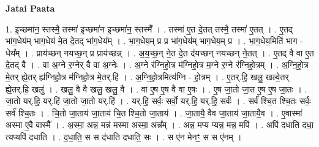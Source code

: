 \documentclass[17pt]{extarticle}
\begin{document}
\textbf{Jatai Paata} \newline

1. इ॒च्छमा॑न॒ स्तस्मै॒ तस्मा॑ इ॒च्छमा॑न इ॒च्छमा॑न॒ स्तस्मै᳚ । . तस्मा॑ ए॒त दे॒तत् तस्मै॒ तस्मा॑ ए॒तत् । . ए॒तद् भा॑ग॒धेय॑म् भाग॒धेय॑ मे॒त दे॒तद् भा॑ग॒धेय᳚म् । . भा॒ग॒धेय॒म् प्र प्र भा॑ग॒धेय॑म् भाग॒धेय॒म् प्र । . भा॒ग॒धेय॒मिति॑ भाग - धेय᳚म् । . प्राय॑च्छन् नयच्छ॒न् प्र प्राय॑च्छन्न् । . अ॒य॒च्छ॒न् ने॒त दे॒त द॑यच्छन् नयच्छन् ने॒तत् । . ए॒तद् वै वा ए॒त दे॒तद् वै । . वा अ॒ग्ने र॒ग्नेर् वै वा अ॒ग्नेः । . अ॒ग्ने र॑ग्निहो॒त्र म॑ग्निहो॒त्र म॒ग्ने र॒ग्ने र॑ग्निहो॒त्रम् । . अ॒ग्नि॒हो॒त्र मे॒तर् ह्ये॒तर् ह्य॑ग्निहो॒त्र म॑ग्निहो॒त्र मे॒तर्.हि॑ । . अ॒ग्नि॒हो॒त्रमित्य॑ग्नि - हो॒त्रम् । . ए॒तर्.हि॒ खलु॒ खल्वे॒तर् ह्ये॒तर्.हि॒ खलु॑ । . खलु॒ वै वै खलु॒ खलु॒ वै । . वा ए॒ष ए॒ष वै वा ए॒षः । . ए॒ष जा॒तो जा॒त ए॒ष ए॒ष जा॒तः । . जा॒तो यर्.हि॒ यर्.हि॑ जा॒तो जा॒तो यर्.हि॑ । . यर्.हि॒ सर्वः॒ सर्वो॒ यर्.हि॒ यर्.हि॒ सर्वः॑ । . सर्व॑ श्चि॒त श्चि॒तः सर्वः॒ सर्व॑ श्चि॒तः । . चि॒तो जा॒ताय॑ जा॒ताय॑ चि॒त श्चि॒तो जा॒ताय॑ । . जा॒तायै॒ वैव जा॒ताय॑ जा॒तायै॒व । . ए॒वास्मा॑ अस्मा ए॒वै वास्मै᳚ । . अ॒स्मा॒ अन्न॒ मन्न॑ मस्मा अस्मा॒ अन्न᳚म् । . अन्न॒ मप्य प्यन्न॒ मन्न॒ मपि॑ । . अपि॑ दधाति दधा॒ त्यप्यपि॑ दधाति । . द॒धा॒ति॒ स स द॑धाति दधाति॒ सः । . स ए॑न मेनꣳ॒॒ स स ए॑नम् । \newline
\end{document}
